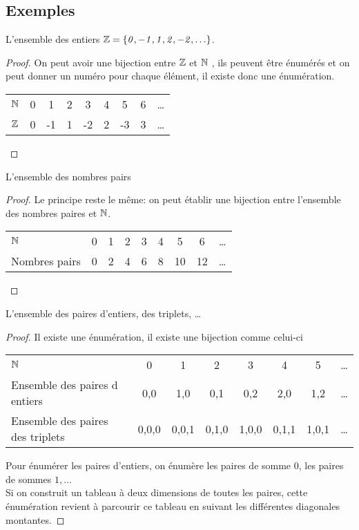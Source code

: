 \subsection{Exemples}
\label{subsec:exemples}

\begin{myexem}
  L'ensemble des entiers $\mathit{\mathbb{Z}=\{0,-1,1,2,-2,\ldots\}}$.
  \begin{proof}
     On peut avoir une bijection entre $\mathbb{Z}$ et $\mathbb{N}$ , ils peuvent être énumérés et on peut donner un numéro pour chaque élément, il existe donc une énumération. 
  
  \begin{tabular}{ l | c c c c c c c r }
     $\mathbb{N}$ & 0 & 1 & 2  & 3 & 4 & 5 & 6 & \ldots \\
     $\mathbb{Z}$ & 0 & -1 & 1 & -2 & 2 & -3 & 3  & \ldots \\
    
    \end{tabular}
  \end{proof}
\end{myexem}
  
\begin{myexem}
 L'ensemble des nombres pairs
  \begin{proof}
  Le principe reste le même: on peut établir une bijection entre l'ensemble des nombres paires et $\mathbb{N}$.
 
   \begin{tabular}{ l c c c c c c c r }
    $\mathbb{N}$ & 0 & 1 & 2  & 3 & 4 & 5 & 6 & \ldots \\
      Nombres pairs & 0 & 2 & 4 & 6 & 8 & 10 & 12  & \ldots \\
    \end{tabular}
  \end{proof} 
\end{myexem}
  
\begin{myexem}
  L'ensemble des paires d'entiers, des triplets, \ldots
    \begin{proof}
        Il existe une énumération, il existe une bijection comme celui-ci  
      
		\begin{tabular}{ l c c  c  c c c  r }
			$\mathbb{N}$  & 0 & 1 & 2  & 3 & 4 & 5 & \ldots  \\
			Ensemble des paires d entiers & {0,0} & {1,0} & {0,1} & {0,2} & {2,0} & {1,2}  & \ldots \\
			Ensemble des paires des triplets & {0,0,0} & {0,0,1} & {0,1,0} & {1,0,0} & {0,1,1} & {1,0,1}  & \ldots \\
			
		\end{tabular}
	
	Pour énumérer les paires d'entiers, on énumère les paires de somme 0, les paires de sommes $1, \ldots$ \\
	Si on construit un tableau à deux dimensions de toutes les paires, cette énumération revient à parcourir ce tableau en suivant les différentes diagonales montantes.  
    \end{proof}   
\end{myexem}
  

